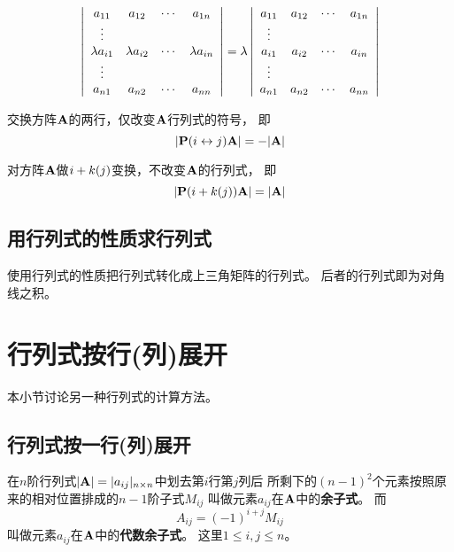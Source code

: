\begin{theorem}
  \begin{displaymath}
    \mdet{cccc}{
      a_{11} & a_{12} & \cdots & a_{1n} \\
      \vdots &        &        &        \\
      \lambda a_{i1} & \lambda a_{i2} & \cdots & \lambda a_{in} \\
      \vdots &        &        &        \\
      a_{n1} & a_{n2} & \cdots & a_{nn} }
    = \lambda \mdet{cccc}{
      a_{11} & a_{12} & \cdots & a_{1n} \\
      \vdots &        &        &        \\
      a_{i1} & a_{i2} & \cdots & a_{in} \\
      \vdots &        &        &        \\
      a_{n1} & a_{n2} & \cdots & a_{nn} }
  \end{displaymath}
\end{theorem}

\begin{theorem} \label{thrm-det-rowswi}
  交换方阵$\mmA$的两行，仅改变$\mmA$行列式的符号，
  即\[ |\mmRowSwi{i}{j}\mmA| = -|\mmA| \]
\end{theorem}

\begin{theorem} \label{thrm-det-rowadd}
  对方阵$\mmA$做$\mTfRowAdd{i}{+k}{j}$变换，不改变$\mmA$的行列式，
  即\[ |\mmRowAdd{i}{+k}{j}\mmA| = |\mmA| \]
\end{theorem}

\subsection{用行列式的性质求行列式}
使用行列式的性质把行列式转化成上三角矩阵的行列式。
后者的行列式即为对角线之积。

\section{行列式按行(列)展开}
本小节讨论另一种行列式的计算方法。

\subsection{行列式按一行(列)展开}
\begin{definition}[余子式]
  在$n$阶行列式$|\mmA|=|a_{ij}|_{n\times n}$中划去第$i$行第$j$列后
  所剩下的$(n-1)^2$个元素按照原来的相对位置排成的$n-1$阶子式$M_{ij}$
  叫做元素$a_{ij}$在$\mmA$中的\textbf{余子式}。
  而\[ A_{ij} = (-1)^{i+j}M_{ij} \]
  叫做元素$a_{ij}$在$\mmA$中的\textbf{代数余子式}。
  这里$1\le i, j \le n$。
\end{definition}


